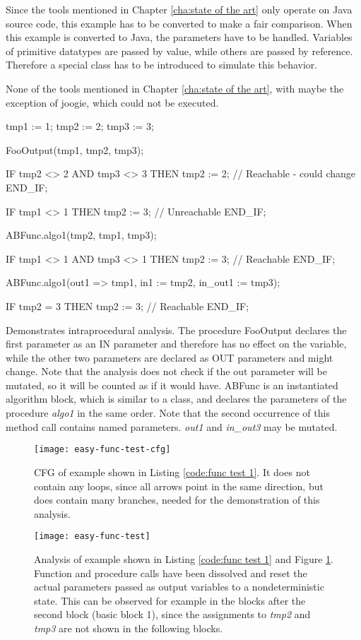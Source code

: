 Since the tools mentioned in Chapter \ref{cha:state of the art} only operate on Java source code, this example has to be converted to make a fair comparison.
When this example is converted to Java, the parameters have to be handled. Variables of primitive datatypes are passed by value, while others are passed by reference. Therefore a special class has to be introduced to simulate this behavior. 

None of the tools mentioned in Chapter \ref{cha:state of the art}, with maybe the exception of joogie, which could not be executed.


\begin{program}[h!]
	\begin{GenericCode}
tmp1 := 1;
tmp2 := 2;
tmp3 := 3;

FooOutput(tmp1, tmp2, tmp3);

IF tmp2 <> 2 AND tmp3 <> 3 THEN
	tmp2 := 2; // Reachable - could change
END_IF;

IF tmp1 <> 1 THEN
	tmp2 := 3; // Unreachable
END_IF;

ABFunc.algo1(tmp2, tmp1, tmp3);

IF tmp1 <> 1 AND tmp3 <> 1 THEN
	tmp2 := 3; // Reachable
END_IF;

ABFunc.algo1(out1 => tmp1, in1 := tmp2, in_out1 := tmp3);

IF tmp2 = 3 THEN
	tmp2 := 3; // Reachable
END_IF;	\end{GenericCode}
	\centering
	\caption{Demonstrates intraprocedural analysis. The procedure  FooOutput declares the first parameter as an IN parameter and therefore has no effect on the variable, while the other two parameters are declared as OUT parameters and might change. Note that the analysis does not check if the out parameter will be mutated, so it will be counted as if it would have. ABFunc is an instantiated algorithm block, which is similar to a class, and declares the parameters of the procedure \emph{algo1} in the same order. Note that the second occurrence of this method call contains named parameters. \emph{out1} and \emph{in\_out3} may be mutated.}
	\label{code:func test 1}
\end{program}
\begin{figure}[h!]
	\centering
	\texttt{[image: easy-func-test-cfg]}
	\caption{CFG of example shown in Listing \ref{code:func test 1}. It does not contain any loops, since all arrows point in the same direction, but does contain many branches, needed for the demonstration of this analysis.}
	\label{fig:func test 1 cfg}
\end{figure}
\begin{figure}[h!]
	\centering
	\texttt{[image: easy-func-test]}
	\caption{Analysis of example shown in Listing \ref{code:func test 1} and Figure \ref{fig:func test 1 cfg}. Function and procedure calls have been dissolved and reset the actual parameters passed as output variables to a nondeterministic state. This can be observed for example in the blocks after the second block (basic block 1), since the assignments to \emph{tmp2} and \emph{tmp3} are not shown in the following blocks.}
	\label{fig:func test 1}
\end{figure}

